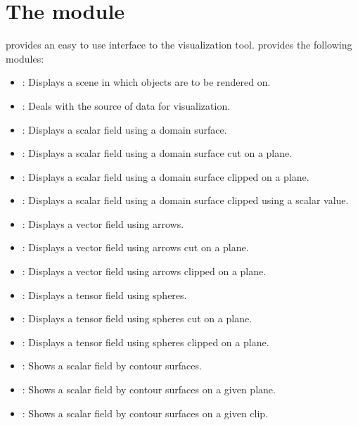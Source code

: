 \chapter{The module \pyvisi}
\label{PYVISI CHAP}


\pyvisi provides an easy to use interface to the \VTK visualization 
tool. \pyvisi provides the following modules:

\begin{itemize}
\item \Scene: Displays a scene in which objects are to be rendered on.
\item \DataCollector: Deals with the source of data for visualization.
\item \Map: Displays a scalar field using a domain surface.
\item \MapOnPlaneCut: Displays a scalar field using a domain surface cut on a plane. 
\item \MapOnPlaneClip: Displays a scalar field using a domain surface clipped 
		on a plane.
\item \MapOnScalarClip: Displays a scalar field using a domain surface clipped 
		using a scalar value.
\item \Velocity: Displays a vector field using arrows.
\item \VelocityOnPlaneCut: Displays a vector field using arrows cut on a plane.
\item \VelocityOnPlaneClip: Displays a vector field using arrows clipped on a 
		plane.
\item \Ellipsoid: Displays a tensor field using spheres.
\item \EllipsoidOnPlaneCut: Displays a tensor field using spheres cut on a
        plane.
\item \EllipsoidOnPlaneClip: Displays a tensor field using spheres clipped 
        on a plane.
        
\item \Contour: Shows a scalar field by contour surfaces. 
\item \ContourOnPlane: Shows a scalar field by contour surfaces on 
a given plane.
\item \ContourOnClip: Shows a scalar field by contour surfaces on 
a given clip.


\end{itemize}
